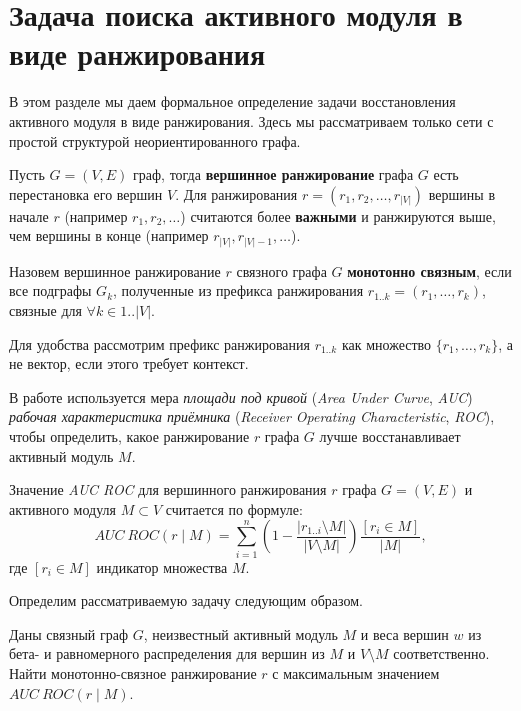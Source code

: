 \section{Задача поиска активного модуля в виде ранжирования}
\label{sec_formal_defs}

В этом разделе мы даем формальное определение задачи восстановления активного
модуля в виде ранжирования. Здесь мы рассматриваем только сети с простой
структурой неориентированного графа.

\begin{definition}
    Пусть $G = (V, E)$ граф, тогда \textbf{вершинное ранжирование} графа $G$ есть
    перестановка его вершин $V$.  Для ранжирования $r = (r_1, r_2, \ldots,
    r_{|V|})$ вершины в начале $r$ (например $r_1, r_2, \ldots$) считаются
    более \textbf{важными} и ранжируются выше, чем вершины в конце (например
    $r_{|V|}, r_{|V|-1}, \ldots$).
\end{definition}

\begin{definition}
    Назовем вершинное ранжирование $r$ связного графа $G$ \textbf{монотонно
    связным}, если все подграфы $G_k$, полученные из префикса ранжирования
    $r_{1..k} = (r_1, \ldots, r_k)$, связные для $\forall k \in {1..|V|}$.
\end{definition}

Для удобства рассмотрим префикс ранжирования $r_{1..k}$ как множество $\{r_1, \ldots,
r_k\}$, а не вектор, если этого требует контекст.

В работе используется мера \emph{площади под кривой} (\emph{Area Under Curve},
\emph{AUC}) \emph{рабочая характеристика приёмника} (\emph{Receiver Operating
Characteristic}, \emph{ROC}), чтобы определить, какое ранжирование $r$ графа $G$ лучше
восстанавливает активный модуль $M$.

\begin{definition}
    Значение \emph{AUC ROC} для вершинного ранжирования $r$ графа $G = (V, E)$
    и активного модуля $M \subset V$ считается по формуле:
    \[ AUC~ROC(r \mid M) = \sum_{i=1}^n \left( 1 - \frac{|r_{1..i} \setminus M|}{|V
    \setminus M|} \right) \frac{[r_i \in M]}{|M|}, \]
    где $[r_i \in M]$ индикатор множества $M$.
\end{definition}

Определим рассматриваемую задачу следующим образом.
\begin{problem}
    Даны связный граф $G$, неизвестный активный модуль $M$ и веса вершин $w$ из
    бета- и равномерного распределения для вершин из $M$ и $V \setminus M$
    соответственно. Найти монотонно-связное ранжирование $r$ с максимальным
    значением $AUC~ROC(r \mid M)$.
\end{problem}

